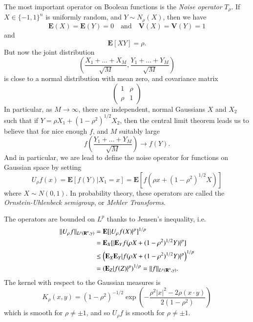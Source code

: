 The most important operator on Boolean functions is the \emph{Noise operator} $T_\rho$. If $X \in \{ -1, 1 \}^n$ is uniformly random, and $Y \sim N_\rho(X)$, then we have
%
\[ \mathbf{E}(X) = \mathbf{E}(Y) = 0 \quad\text{and}\quad \mathbf{V}(X) = \mathbf{V}(Y) = 1 \]
%
and
%
\[ \mathbf{E}[X Y] = \rho. \]
%
But now the joint distribution
%
\[ \left( \frac{X_1 + \dots + X_M}{\sqrt{M}}, \frac{Y_1 + \dots + Y_M}{\sqrt{M}} \right) \]
%
is close to a normal distribution with mean zero, and covariance matrix
%
\[ \begin{pmatrix} 1 & \rho \\ \rho & 1 \end{pmatrix}  \]
%
In particular, as $M \to \infty$, there are independent, normal Gaussians $X$ and $X_2$ such that if $Y = \rho X_1 + (1 - \rho^2)^{1/2} X_2$, then the central limit theorem leads us to believe that for nice enough $f$, and $M$ suitably large
%
\[ f \left( \frac{Y_1 + \dots + Y_M}{\sqrt{M}} \right) \to f \left( Y \right). \]
%
And in particular, we are lead to define the noise operator for functions on Gaussian space by setting
%
\[ U_\rho f(x) = \mathbf{E}[ f(Y) | X_1 = x ] = \mathbf{E} \left[ f( \rho x + (1 - \rho^2)^{1/2} X ) \right] \]
%
where $X \sim N(0,1)$. In probability theory, these operators are called the \emph{Ornstein-Uhlenbeck semigroup}, or \emph{Mehler Transforms}.

The operators are bounded on $L^p$ thanks to Jensen's inequality, i.e.
%
\begin{align*}
    \| U_\rho f \|_{L^p(\operatorname{\mathbf{R}}^n, \gamma)} &= \mathbf{E} [ |U_\rho f(X)|^p ]^{1/p}\\
    &= \mathbf{E}_X [ | \mathbf{E}_Y f( \rho X + (1 - \rho^2)^{1/2} Y ) |^p ]\\
    &\leq \left( \mathbf{E}_X \mathbf{E}_Y |f(\rho X + (1 - \rho^2)^{1/2} Y)|^p \right)^{1/p}\\
    &= \left( \mathbf{E}_Z |f(Z)|^p \right)^{1/p} = \| f \|_{L^p(\operatorname{\mathbf{R}}^n, \gamma)}.
\end{align*}
%
The kernel with respect to the Gaussian measures is
%
\[ K_\rho(x,y) = (1 - \rho^2)^{-1/2} \exp \left( - \frac{\rho^2 |x|^2 - 2 \rho (x \cdot y)}{2 (1 - \rho^2)} \right) \]
%
which is smooth for $\rho \neq \pm 1$, and so $U_\rho f$ is smooth for $\rho \neq \pm 1$.

